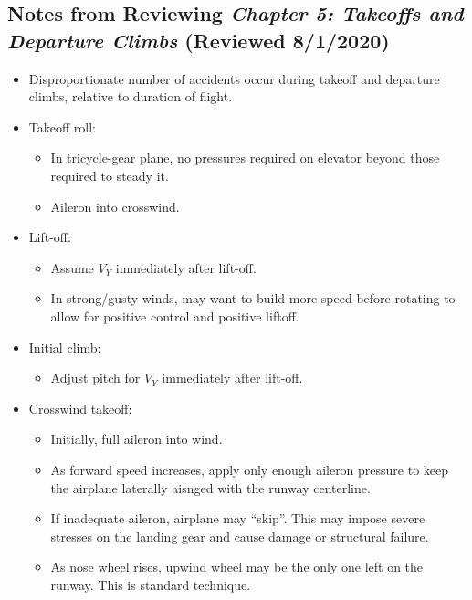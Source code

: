 \documentclass[letterpaper,10pt,titlepage]{article}
\begin{document}

\subsection{Notes from Reviewing \emph{Chapter 5:  Takeoffs and Departure
            Climbs}
            (Reviewed 8/1/2020)}
\label{snra0:stdc0}

\begin{itemize}
\item Disproportionate number of accidents occur during takeoff and departure climbs,
      relative to duration of flight.
\item Takeoff roll:
      \begin{itemize}
      \item In tricycle-gear plane, no
            pressures required on elevator beyond those required
            to steady it.
      \item Aileron into crosswind.
	  \end{itemize}
\item Lift-off:
      \begin{itemize}
      \item Assume $V_Y$ immediately after lift-off.
      \item In strong/gusty winds, may want to build more speed before rotating
	        to allow for positive control and positive liftoff.
	  \end{itemize}
\item Initial climb:
      \begin{itemize}
      \item Adjust pitch for $V_Y$ immediately after lift-off.
	  \end{itemize}
\item Crosswind takeoff:
      \begin{itemize}
      \item Initially, full aileron into wind.
	  \item As forward speed increases, apply only enough aileron pressure
	        to keep the airplane laterally aisnged with the runway centerline.
      \item If inadequate aileron, airplane may ``skip''.  This may impose
	        severe stresses on the landing gear and cause damage or structural
			failure.
      \item As nose wheel rises, upwind wheel may be the only one left
	        on the runway.  This is standard technique.

\end{itemize}
\end{itemize}
\end{document}
